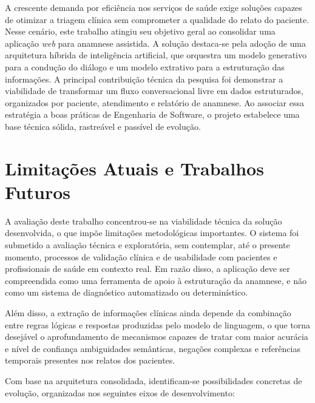 A crescente demanda por eficiência nos serviços de saúde exige soluções capazes de otimizar a triagem clínica sem comprometer a qualidade do relato do paciente. Nesse cenário, este trabalho atingiu seu objetivo geral ao consolidar uma aplicação \textit{web} para anamnese assistida. A solução destaca-se pela adoção de uma arquitetura híbrida de inteligência artificial, que orquestra um modelo generativo para a condução do diálogo e um modelo extrativo para a estruturação das informações. A principal contribuição técnica da pesquisa foi demonstrar a viabilidade de transformar um fluxo conversacional livre em dados estruturados, organizados por paciente, atendimento e relatório de anamnese. Ao associar essa estratégia a boas práticas de Engenharia de Software, o projeto estabelece uma base técnica sólida, rastreável e passível de evolução.

\section{Limitações Atuais e Trabalhos Futuros}

A avaliação deste trabalho concentrou-se na viabilidade técnica da solução desenvolvida, o que impõe limitações metodológicas importantes. O sistema foi submetido a avaliação técnica e exploratória, sem contemplar, até o presente momento, processos de validação clínica e de usabilidade com pacientes e profissionais de saúde em contexto real. Em razão disso, a aplicação deve ser compreendida como uma ferramenta de apoio à estruturação da anamnese, e não como um sistema de diagnóstico automatizado ou determinístico.

Além disso, a extração de informações clínicas ainda depende da combinação entre regras lógicas e respostas produzidas pelo modelo de linguagem, o que torna desejável o aprofundamento de mecanismos capazes de tratar com maior acurácia e nível de confiança ambiguidades semânticas, negações complexas e referências temporais presentes nos relatos dos pacientes.

Com base na arquitetura consolidada, identificam-se possibilidades concretas de evolução, organizadas nos seguintes eixos de desenvolvimento:

